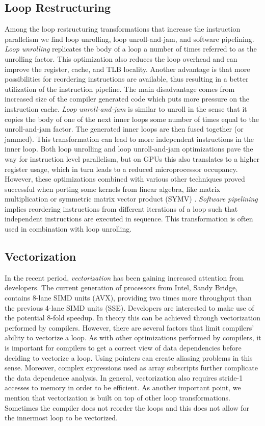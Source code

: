 \subsection{Loop Restructuring}

Among the loop restructuring transformations that increase the instruction
parallelism we find loop unrolling, loop unroll-and-jam, and software
pipelining. \textit{Loop unrolling} replicates the body of a loop a number of
times referred to as the unrolling factor. This optimization also reduces the loop
overhead and can improve the register, cache, and TLB locality. Another
advantage is that more possibilities for reordering instructions are available,
thus resulting in a better utilization of the instruction pipeline. The main
disadvantage comes from increased size of the compiler generated code which puts
more pressure on the instruction cache. \textit{Loop unroll-and-jam} is similar
to unroll in the sense that it copies the body of one of the next inner loops some number
of times equal to the unroll-and-jam factor. The generated inner loops are then
fused together (or jammed). This transformation can lead to more independent
instructions in the inner loop. Both loop unrolling and loop unroll-and-jam
optimizations pave the way for instruction level parallelism, but on GPUs this
also translates to a higher register usage, which in turn leads to a reduced
microprocessor occupancy. However, these optimizations combined with various
other techniques proved successful when porting some kernels from linear
algebra, like matrix multiplication \cite{Volkov:2008:BGT:1413370.1413402} or
symmetric matrix vector product (SYMV) \cite{Nath:2011:OSD:2063384.2063392}.
\textit{Software pipelining} implies reordering instructions from different
iterations of a loop such that independent instructions are executed in
sequence. This transformation is often used in combination with loop unrolling.

\subsection{Vectorization}

In the recent period, \textit{vectorization} has been gaining increased
attention from developers. The current generation of processors from Intel,
Sandy Bridge, contains 8-lane SIMD units (AVX), providing two times more
throughput than the previous 4-lane SIMD units (SSE). Developers are interested
to make use of the potential 8-fold speedup. In theory this can be achieved
through vectorization performed by compilers. However, there are several factors
that limit compilers' ability to vectorize a loop. As with other optimizations
performed by compilers, it is important for compilers to get a correct view of
data dependencies before deciding to vectorize a loop. Using pointers can create
aliasing problems in this sense. Moreover, complex expressions used as array
subscripts further complicate the data dependence analysis. In general,
vectorization also requires stride-1 accesses to memory in order to be
efficient. As another important point, we mention that vectorization is built on
top of other loop transformations. Sometimes the compiler does not reorder the
loops and this does not allow for the innermost loop to be vectorized.

